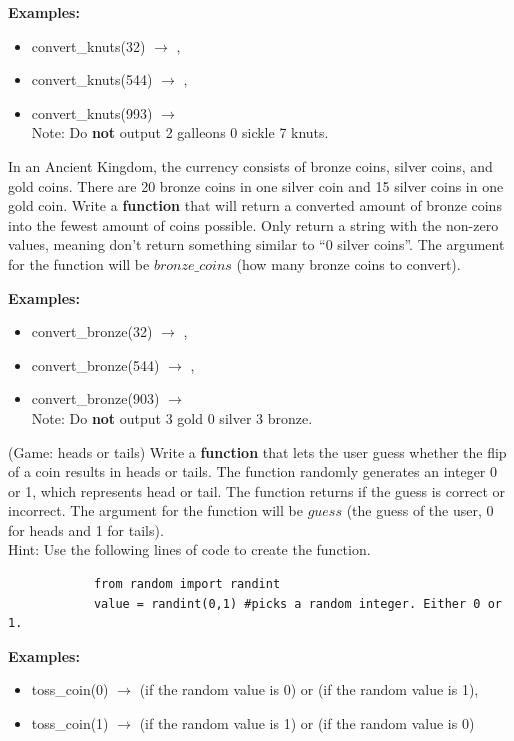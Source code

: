 		\textbf{Examples:}
		\begin{itemize}
			\item  convert\_knuts(32) $\rightarrow$ , 
			\item  convert\_knuts(544) $\rightarrow$ , 
			\item  convert\_knuts(993) $\rightarrow$ \\
				Note: Do \textbf{not} output 2 galleons 0 sickle 7 knuts.
		\end{itemize}


	\item 
		In an Ancient Kingdom, the currency consists of bronze coins, silver coins, and gold coins.  There are 20 bronze coins in 
		one silver coin and 15 silver coins in one gold coin.  Write a \textbf{function} that will return a converted amount of 
		bronze coins into the fewest amount of coins possible.  Only return a string with the non-zero values, 
		meaning don't return something similar to ``0 silver coins''.  The argument for the function will be 
		$bronze\_coins$ (how many bronze coins to convert). 

		\textbf{Examples:}
		\begin{itemize}
			\item  convert\_bronze(32) $\rightarrow$ , 
			\item  convert\_bronze(544) $\rightarrow$ , 
			\item  convert\_bronze(903) $\rightarrow$ \\
				Note: Do \textbf{not} output 3 gold 0 silver 3 bronze.
		\end{itemize}

	\item 
		(Game: heads or tails)  Write a \textbf{function} that lets the user guess whether the flip of a coin 
		results in heads or tails. The function randomly generates an integer 0 or 1, which 
		represents head or tail. The function returns if the guess is correct or incorrect. The argument for the function will be $guess$ 
		(the guess of the user, 0 for heads and 1 for tails).\\
		Hint: Use the following lines of code to create the function.
		\begin{verbatim}
		    from random import randint
		    value = randint(0,1) #picks a random integer. Either 0 or 1.
		\end{verbatim}
		\textbf{Examples:}
		\begin{itemize}
			\item  toss\_coin(0) $\rightarrow$  (if the random value is 0) or  (if the random value is 1), 
			\item  toss\_coin(1) $\rightarrow$  (if the random value is 1) or  (if the random value is 0) 
		\end{itemize}

